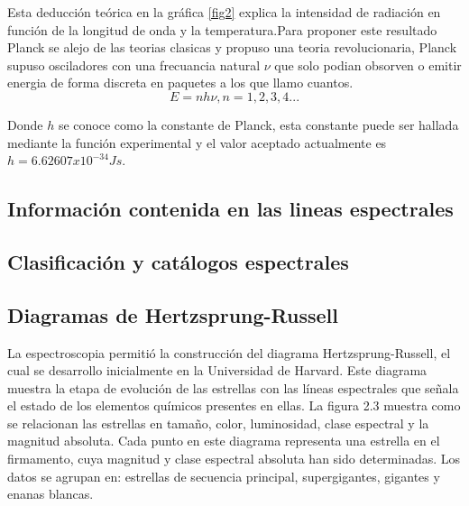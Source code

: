 Esta deducción teórica en la gráfica \ref{fig2} explica la intensidad de radiación en función de la longitud de onda y la temperatura.Para proponer este resultado Planck se alejo de las teorias clasicas y propuso una teoria revolucionaria, Planck supuso osciladores con una frecuancia natural $\nu$ que solo podian obsorven o emitir energia de forma discreta en paquetes a los que llamo cuantos.
\begin{equation}
    E= nh\nu , n=1,2,3,4...
\end{equation}{}

Donde $h$ se conoce como la constante de Planck, esta constante puede ser hallada mediante la función experimental y el valor aceptado actualmente es $h=6.62607x10^{-34} Js$.



\subsection {Información contenida en las lineas espectrales}
\subsection {Clasificación y catálogos espectrales}









\subsection {Diagramas de Hertzsprung-Russell}


La espectroscopia permitió la construcción del diagrama Hertzsprung-Russell, el cual se desarrollo inicialmente en la Universidad de Harvard.
Este diagrama muestra la etapa de evolución de las estrellas con las líneas espectrales que señala el estado de los elementos químicos presentes en ellas. La figura 2.3 muestra como se relacionan las estrellas en tamaño, color, luminosidad, clase espectral y la magnitud absoluta. Cada punto en este diagrama representa una estrella en el firmamento, cuya magnitud y clase espectral absoluta han sido determinadas. Los datos se agrupan en: estrellas de secuencia principal, supergigantes, gigantes y enanas
blancas.




